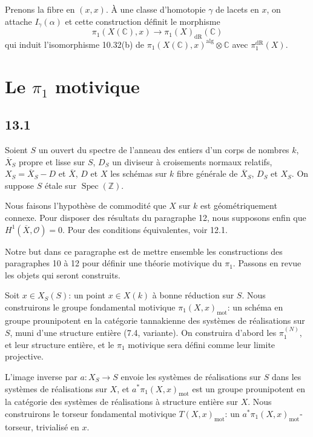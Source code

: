 \documentclass[12pt,a4paper]{article}
\theoremstyle{plain}
\theoremstyle{definition}
\theoremstyle{remark}
\DeclareMathOperator{\Spec}{Spec}
\newcommand{\cO}{\mathcal{O}}
\newcommand{\bZ}{\mathbb{Z}}
\newcommand{\bC}{\mathbb{C}}
\newcommand{\dr}{\mathrm{dR}}
\newcommand{\mot}{\mathrm{mot}}
\begin{document}
Prenons la fibre en $(x,x)$. À une classe d'homotopie $\gamma$ de lacets en $x$, on attache $I_\gamma(\alpha)$ et cette construction définit le morphisme
\begin{equation}\label{eq:12.16.1}
\pi_1(X(\bC), x) \to \pi_1(X)_{\dr}(\bC)
\end{equation}
qui induit l'isomorphisme 10.32(b) de $\pi_1(X(\bC),x)^{\text{alg}} \otimes \bC$ avec $\pi_1^{\dr}(X)$.


\section{Le $\pi_1$ motivique}\label{sec:13}

\subsection*{13.1}

Soient $S$ un ouvert du spectre de l'anneau des entiers d'un corps de nombres $k$, $\overline{X}_S$ propre et lisse sur $S$, $D_S$ un diviseur à croisements normaux relatifs, $X_S = \overline{X}_S - D$ et $\overline{X}$, $D$ et $X$ les schémas sur $k$ fibre générale de $\overline{X}_S$, $D_S$ et $X_S$. On suppose $S$ étale sur $\Spec(\bZ)$.

Nous faisons l'hypothèse de commodité que $X$ sur $k$ est géométriquement connexe. Pour disposer des résultats du paragraphe 12, nous supposons enfin que $H^1(\overline{X}, \cO) = 0$. Pour des conditions équivalentes, voir 12.1.

Notre but dans ce paragraphe est de mettre ensemble les constructions des paragraphes 10 à 12 pour définir une théorie motivique du $\pi_1$. Passons en revue les objets qui seront construits.

Soit $x \in X_S(S)$: un point $x \in X(k)$ à bonne réduction sur $S$. Nous construirons le groupe fondamental motivique $\pi_1(X,x)_{\mot}$: un schéma en groupe prounipotent en la catégorie tannakienne des systèmes de réalisations sur $S$, muni d'une structure entière (7.4, variante). On construira d'abord les $\pi_1^{(N)}$, et leur structure entière, et le $\pi_1$ motivique sera défini comme leur limite projective.

L'image inverse par $a : X_S \to S$ envoie les systèmes de réalisations sur $S$ dans les systèmes de réalisations sur $X$, et $a^* \pi_1(X,x)_{\mot}$ est un groupe prounipotent en la catégorie des systèmes de réalisations à structure entière sur $X$. Nous construirons le torseur fondamental motivique $T(X,x)_{\mot}$: un $a^* \pi_1(X,x)_{\mot}$-torseur, trivialisé en $x$.
\end{document}
